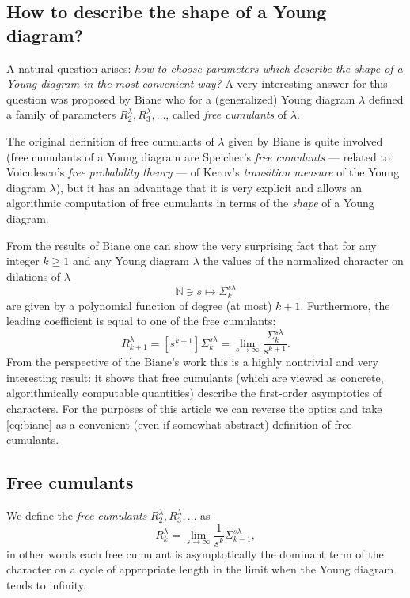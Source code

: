 \documentclass[12pt]{amsart}
\theoremstyle{plain}
\theoremstyle{remark}
\begin{document}
\subsection{How to describe the shape of a Young diagram?}
A natural question arises: \emph{how to choose parameters which describe the
shape of a Young diagram in the most convenient way?} A very interesting answer
for this question was proposed by Biane \cite{Biane1998} who for a (generalized)
Young diagram $\lambda$ defined a family of parameters
$R_2^{\lambda},R_3^{\lambda},\dots$, called \emph{free cumulants} of $\lambda$.

The original definition of free cumulants of $\lambda$ given by Biane is quite
involved (free cumulants of a Young diagram are Speicher's \emph{free cumulants}
\cite{NicaSpeicher2006} --- related to Voiculescu's \emph{free probability
theory} \cite{VoiculescuDykemaNica1992} --- of Kerov's \emph{transition
measure} \cite{Kerov1993} of the Young diagram $\lambda$), but it has an
advantage that it is very explicit and allows an algorithmic computation of
free cumulants in terms of the \emph{shape} of a Young diagram.

From the results of Biane \cite{Biane1998} one can show the very surprising fact
that for any integer $k\geq 1$ and any Young diagram $\lambda$ the values of the
normalized character on dilations of $\lambda$
$$ \mathbb{N} \ni s \mapsto \Sigma_k^{s\lambda} $$
are given by a polynomial function of degree (at most) $k+1$. Furthermore, the
leading coefficient is equal to one of the free cumulants:
\begin{equation} 
\label{eq:biane}
R_{k+1}^{\lambda}=[s^{k+1}] \Sigma_k^{s\lambda} =
\lim_{s\to\infty} \frac{\Sigma^{s\lambda}_{k}}{s^{k+1}}.
\end{equation}
From the perspective of the Biane's work \cite{Biane1998} this is a highly
nontrivial and very interesting result: it shows that free cumulants (which are
viewed as concrete, algorithmically computable quantities) describe the
first-order asymptotics of characters.
For the purposes of this article we can reverse the optics and take
\eqref{eq:biane} as a convenient (even if somewhat abstract) definition of free
cumulants.


\subsection{Free cumulants}
We define the \emph{free
cumulants} $R_2^\lambda,R_3^\lambda,\dots$ as
$$R_{k}^\lambda = \lim_{s\to\infty} \frac{1}{s^{k}}
\Sigma^{s\lambda}_{k-1}, $$
in other words each free cumulant is asymptotically the dominant term of the
character on a cycle of appropriate length in the limit when the Young diagram
tends
to infinity.
\end{document}
